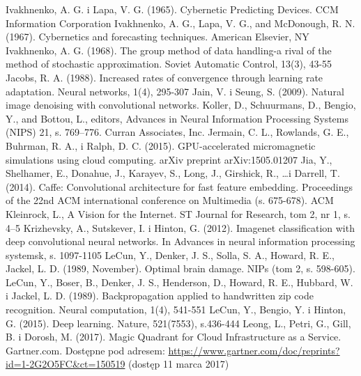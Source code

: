 \documentclass[12pt,a4paper,twoside]{article}
\begin{document}
\begin{thebibliography}{99}
 Ivakhnenko, A. G. i Lapa, V. G. (1965). Cybernetic Predicting Devices. CCM Information Corporation
 Ivakhnenko, A. G., Lapa, V. G., and McDonough, R. N. (1967). Cybernetics and forecasting techniques. American Elsevier, NY
 Ivakhnenko, A. G. (1968). The group method of data handling-a rival of the method of stochastic approximation. Soviet Automatic Control, 13(3), 43-55
 Jacobs, R. A. (1988). Increased rates of convergence through learning rate adaptation. Neural networks, 1(4), 295-307
 Jain, V. i Seung, S. (2009). Natural image denoising with convolutional networks. Koller, D., Schuurmans, D., Bengio, Y., and Bottou, L., editors, Advances in Neural Information Processing Systems (NIPS) 21, s. 769–776. Curran Associates, Inc.
 Jermain, C. L., Rowlands, G. E., Buhrman, R. A., i Ralph, D. C. (2015). GPU-accelerated micromagnetic simulations using cloud computing. arXiv preprint arXiv:1505.01207
 Jia, Y., Shelhamer, E., Donahue, J., Karayev, S., Long, J., Girshick, R., \ldots i Darrell, T. (2014). Caffe: Convolutional architecture for fast feature embedding. Proceedings of the 22nd ACM international conference on Multimedia (s. 675-678). ACM
 Kleinrock, L., A Vision for the Internet. ST Journal for Research, tom 2, nr 1, s. 4–5
 Krizhevsky, A., Sutskever, I. i Hinton, G. (2012). Imagenet classification with deep convolutional neural networks. In Advances in neural information processing systemsk, s. 1097-1105
 LeCun, Y., Denker, J. S., Solla, S. A., Howard, R. E., Jackel, L. D. (1989, November). Optimal brain damage. NIPs (tom 2, s. 598-605).
 LeCun, Y., Boser, B., Denker, J. S., Henderson, D., Howard, R. E., Hubbard, W. i Jackel, L. D. (1989). Backpropagation applied to handwritten zip code recognition. Neural computation, 1(4), 541-551
 LeCun, Y., Bengio, Y. i Hinton, G. (2015). Deep learning. Nature, 521(7553), s.436-444
 Leong, L., Petri, G., Gill, B. i Dorosh, M. (2017). Magic Quadrant for Cloud Infrastructure as a Service. Gartner.com. Dostępne pod adresem: \url{https://www.gartner.com/doc/reprints?id=1-2G2O5FC&ct=150519} (dostęp 11 marca 2017)

\end{thebibliography}
\end{document}
